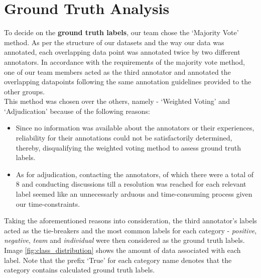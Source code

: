 \documentclass[titlepage]{article}
\begin{document}
\section{Ground Truth Analysis}
To decide on the \textbf{ground truth labels}, our team chose the `Majority Vote' method. As per the structure of our datasets and the way our data 
was annotated, each overlapping data point was annotated twice by two different annotators. In accordance with the requirements of the majority vote 
method, one of our team members acted as the third annotator and annotated the overlapping datapoints following the same annotation guidelines provided 
to the other groups.\\
\newline
This method was chosen over the others, namely - `Weighted Voting' and `Adjudication' because of the following reasons:
\begin{itemize}
  \item Since no information was available about the annotators or their experiences, reliability for their annotations could not be satisfactorily 
  determined, thereby, disqualifying the weighted voting method to assess ground truth labels.
  \item As for adjudication, contacting the annotators, of which there were a total of 8 and conducting discussions till a resolution was reached for 
  each relevant label seemed like an unnecessarly arduous and time-consuming process given our time-constraints. 
\end{itemize}
Taking the aforementioned reasons into consideration, the third annotator's labels acted as the tie-breakers and the most common labels for each category -
\emph{positive}, \emph{negative}, \emph{team} and \emph{individual} were then considered as the ground truth labels.\\
\newline
Image \ref{fig:class_distribution} shows the amount of data associated with each label. Note that the prefix `True' for each category name denotes that the 
category contains calculated ground truth labels.
\end{document}
